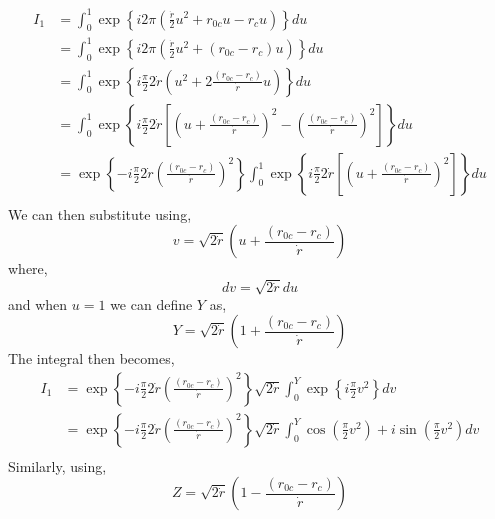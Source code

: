 \begin{equation}
\begin{split}
I_1 &= \int_{0}^{1} \exp{\left\{i 2 \pi(\frac{\dot{r}}{2} u^2 + r_{0c}u - r_cu) \right\}} du \\
&= \int_{0}^{1} \exp{\left\{ i 2 \pi\left(\frac{\dot{r}}{2} u^2 + (r_{0c} - r_c)u \right) \right\}} du \\
& = \int_{0}^{1} \exp{\left\{i \frac{\pi}{2} 2 \dot{r} \left(u^2 + 2\frac{(r_{0c} - r_c)}{\dot{r}}u \right)\right\}} du \\
& = \int_{0}^{1} \exp{\left\{i \frac{\pi}{2} 2 \dot{r} \left[\left(u + \frac{(r_{0c} - r_c)}{\dot{r}} \right)^2 - \left(\frac{(r_{0c} - r_c)}{\dot{r}}\right)^2 \right]\right\}} du \\
& = \exp{\left\{  - i \frac{\pi}{2} 2 \dot{r} \left(\frac{(r_{0c} - r_c)}{\dot{r}}\right)^2 \right\}}\int_{0}^{1} \exp{\left\{i \frac{\pi}{2} 2 \dot{r} \left[\left(u + \frac{(r_{0c} - r_c)}{\dot{r}} \right)^2 \right]\right\}} du \\
\end{split}
\end{equation}
We can then substitute using,
\begin{equation}
v = \sqrt{2\dot{r}}\left( u + \frac{(r_{0c} - r_c)}{\dot{r}}  \right)
\end{equation}
where,
\begin{equation}
dv = \sqrt{2\dot{r}} du 
\end{equation}
and when $u = 1$ we can define $Y$ as,
\begin{equation}
Y = \sqrt{2\dot{r}}\left( 1 + \frac{(r_{0c} - r_c)}{\dot{r}}  \right)
\end{equation}
The integral then becomes,
\begin{equation}
\begin{split}
I_1 & = \exp{\left\{  - i \frac{\pi}{2} 2 \dot{r} \left(\frac{(r_{0c} - r_c)}{\dot{r}}\right)^2 \right\}} \sqrt{2\dot{r}}  \int_{0}^{Y} \exp{\left\{i \frac{\pi}{2} v^2\right\}} dv \\
& = \exp{\left\{  - i \frac{\pi}{2} 2 \dot{r} \left(\frac{(r_{0c} - r_c)}{\dot{r}}\right)^2 \right\}} \sqrt{2\dot{r}}  \int_{0}^{Y} 
\cos{\left(  \frac{\pi}{2} v^2 \right)} + i\sin{\left(  \frac{\pi}{2} v^2 \right)} dv \\
\end{split}
\end{equation}
Similarly, using,
\begin{equation}
Z = \sqrt{2\dot{r}}\left( 1 - \frac{(r_{0c} - r_c)}{\dot{r}}  \right)
\end{equation}
